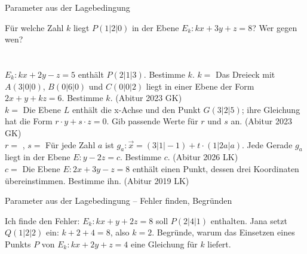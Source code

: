 \setcounter{aufgabe}{11}

\begin{aufgabe}{Parameter aus der Lagebedingung}
\begin{teile}
\teil Für welche Zahl $k$ liegt $P(1 | 2 | 0)$ in der Ebene $E_k: kx + 3y + z = 8$? Wer gegen wen? \\  \\  \\ 
\teil $E_k: kx + 2y - z = 5$ enthält $P(2 | 1 | 3)$. Bestimme $k$. $k = $ \leerfeld
\teil Das Dreieck mit $A(3 | 0 | 0)$, $B(0 | 6 | 0)$ und $C(0 | 0 | 2)$ liegt in einer Ebene der Form $2x + y + kz = 6$. Bestimme $k$. \hfill (Abitur 2023 GK) \\ $k = $ \leerfeld
\teil Die Ebene $L$ enthält die x-Achse und den Punkt $G(3 | 2 | 5)$; ihre Gleichung hat die Form $r \cdot y + s \cdot z = 0$. Gib passende Werte für $r$ und $s$ an. \hfill (Abitur 2023 GK) \\ $r = $ \leerfeld , $s = $ \leerfeld
\teil Für jede Zahl $a$ ist $g_a: \vec{x} = (3 | 1 | -1) + t \cdot (1 | 2a | a)$. Jede Gerade $g_a$ liegt in der Ebene $E: y - 2z = c$. Bestimme $c$. \hfill (Abitur 2026 LK) \\ $c = $ \leerfeld
\teil Die Ebene $E: 2x + 3y - z = 8$ enthält einen Punkt, dessen drei Koordinaten übereinstimmen. Bestimme ihn. \hfill (Abitur 2019 LK) \\ \leerfeld
\end{teile}
\end{aufgabe}

\begin{aufgabe}{Parameter aus der Lagebedingung – Fehler finden, Begründen}
\begin{teile}
\teil Ich finde den Fehler: $E_k: kx + y + 2z = 8$ soll $P(2 | 4 | 1)$ enthalten. Jana setzt $Q(1 | 2 | 2)$ ein: $k + 2 + 4 = 8$, also $k = 2$.
\teil Begründe, warum das Einsetzen eines Punkts $P$ von $E_k: kx + 2y + z = 4$ eine Gleichung für $k$ liefert.
\end{teile}
\end{aufgabe}

